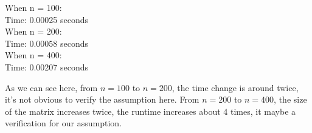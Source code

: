 \documentclass[11pt]{article} %
\begin{document}
When n = 100:\\\linebreak
Time: 0.00025 seconds\\\linebreak
When n = 200:\\\linebreak
Time: 0.00058 seconds\\\linebreak
When n = 400:\\\linebreak
Time: 0.00207 seconds\\\linebreak

As we can see here, from $n = 100$ to $n = 200$, the time change is around twice, it's not obvious to verify the assumption here. From  $n = 200$ to $n = 400$, the size of the matrix increases twice, the runtime increases about 4 times, it maybe a verification for our assumption.
\end{document}
